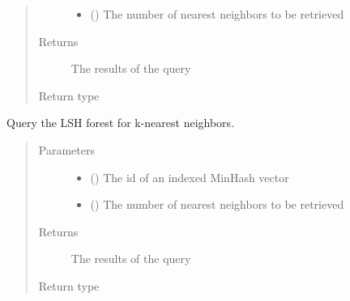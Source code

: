 \documentclass[letterpaper,10pt,english]{sphinxmanual}
\begin{document}
\begin{fulllineitems}
\begin{fulllineitems}
\begin{quote}
\begin{description}
\begin{itemize}
\item {} 
 () \textendash{} The number of nearest neighbors to be retrieved

\end{itemize}

\item[{Returns}] \leavevmode
The results of the query

\item[{Return type}] \leavevmode
{}

\end{description}\end{quote}

\end{fulllineitems}


\begin{fulllineitems}
\label{\detokenize{documentation:tmap.LSHForest.query_by_id}}
Query the LSH forest for k-nearest neighbors.
\begin{quote}\begin{description}
\item[{Parameters}] \leavevmode\begin{itemize}
\item {} 
 () \textendash{} The id of an indexed MinHash vector

\item {} 
 () \textendash{} The number of nearest neighbors to be retrieved

\end{itemize}

\item[{Returns}] \leavevmode
The results of the query

\item[{Return type}] \leavevmode
{}

\end{description}\end{quote}


\end{fulllineitems}
\end{fulllineitems}
\end{document}
